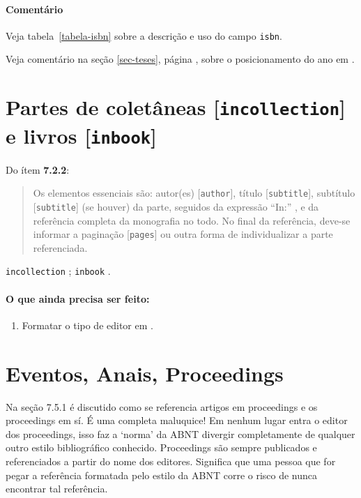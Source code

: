\documentclass[espacosimples]{abnt}
\begin{document}
\paragraph{Comentário}
Veja tabela~\ref{tabela-isbn} sobre a descrição e uso do campo {\tt isbn}.

Veja comentário na seção \ref{sec-teses}, página
  \pageref{sec-teses}, sobre o posicionamento do ano em .

\section{Partes de coletâneas [{\tt incollection}] e livros [{\tt inbook}]}

Do ítem {\bf 7.2.2}\cite{NBR6023:2000}:
\begin{quote}
Os elementos essenciais são: autor(es) [{\tt author}], título [{\tt subtitle}],
subtítulo [{\tt subtitle}] (se houver) da parte,
seguidos da expressão ``In:'' \cite{7.2.2-1}, e da referência completa
da monografia no todo. No final da referência, deve-se informar a paginação [{\tt pages}]
ou outra forma de individualizar a parte referenciada.
\end{quote}

{\tt incollection} \cite{7.2.2-1,8.7.5};
{\tt inbook} \cite{7.2.2-2}.

\paragraph{O que ainda precisa ser feito:}
\begin{enumerate}
\item Formatar o tipo de editor em \cite{7.2.2-1}.
\end{enumerate}

\section{Eventos, Anais, Proceedings}

Na seção 7.5.1\cite{NBR6023:2000} é discutido como se referencia artigos em
proceedings e os proceedings em sí. É uma completa maluquice! Em nenhum
lugar entra o editor dos proceedings, isso faz a `norma' da ABNT divergir
completamente de qualquer outro estilo bibliográfico conhecido. Proceedings
são sempre publicados e referenciados a partir do nome dos editores.
Significa que uma pessoa
que for pegar a referência formatada pelo estilo da ABNT corre o risco
de nunca encontrar tal referência.
\end{document}
